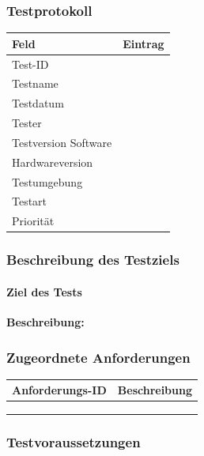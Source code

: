 \subsubsection{Testprotokoll}\label{testprotokoll}

\begin{longtable}[]{@{}ll@{}}
\toprule\noalign{}
Feld & Eintrag \\
\midrule\noalign{}
\endhead
\bottomrule\noalign{}
\endlastfoot
Test-ID & \\
Testname & \\
Testdatum & \\
Tester & \\
Testversion Software & \\
Hardwareversion & \\
Testumgebung & \\
Testart & \\
Priorität & \\
\end{longtable}

\subsubsection{Beschreibung des
Testziels}\label{beschreibung-des-testziels}

\paragraph{Ziel des Tests}\label{ziel-des-tests}

\textbf{Beschreibung:}

\subsubsection{Zugeordnete
Anforderungen}\label{zugeordnete-anforderungen-34}

\begin{longtable}[]{@{}ll@{}}
\toprule\noalign{}
Anforderungs-ID & Beschreibung \\
\midrule\noalign{}
\endhead
\bottomrule\noalign{}
\endlastfoot
& \\
& \\
& \\
\end{longtable}

\subsubsection{Testvoraussetzungen}\label{testvoraussetzungen}

